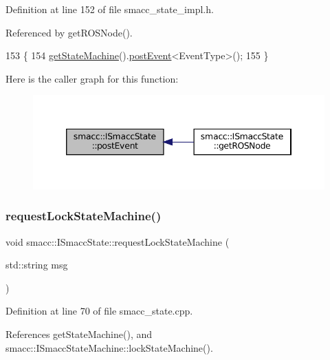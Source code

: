 Definition at line 152 of file smacc\+\_\+state\+\_\+impl.\+h.



Referenced by get\+R\+O\+S\+Node().


\begin{DoxyCode}
153 \{
154     \hyperlink{classsmacc_1_1ISmaccState_a562bb3f9a3ac16b8be71e4794c9e7523}{getStateMachine}().\hyperlink{classsmacc_1_1ISmaccStateMachine_ad80cdd7bbc9a9f3b221c625754fed1ed}{postEvent}<EventType>();
155 \}
\end{DoxyCode}
Here is the caller graph for this function\+:
\nopagebreak
\begin{figure}[H]
\begin{center}
\leavevmode
\includegraphics[width=346pt]{classsmacc_1_1ISmaccState_a1308e7a5348de1870c26b3b00a92cf55_icgraph}
\end{center}
\end{figure}
\mbox{\label{classsmacc_1_1ISmaccState_ae733140761345e027713bd622d93bf0f}} 
\subsubsection{\texorpdfstring{request\+Lock\+State\+Machine()}{requestLockStateMachine()}}
{\footnotesize\ttfamily void smacc\+::\+I\+Smacc\+State\+::request\+Lock\+State\+Machine (\begin{DoxyParamCaption}\item[{std\+::string}]{msg }\end{DoxyParamCaption})\hspace{0.3cm}{\ttfamily [protected]}}



Definition at line 70 of file smacc\+\_\+state.\+cpp.



References get\+State\+Machine(), and smacc\+::\+I\+Smacc\+State\+Machine\+::lock\+State\+Machine().


